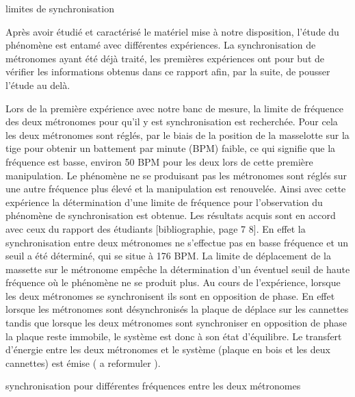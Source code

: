 

limites de synchronisation

	Après avoir étudié et caractérisé le matériel mise à notre disposition, l'étude du phénomène est entamé avec différentes expériences. La synchronisation de métronomes ayant été déjà traité, les premières expériences ont pour but de vérifier les informations obtenus dans ce rapport afin, par la suite, de pousser l'étude au delà.
	 
	Lors de la première expérience avec notre banc de mesure, la limite de fréquence des deux métronomes pour qu'il y est synchronisation est recherchée. Pour cela les deux métronomes sont réglés, par le biais de la position de la masselotte sur la tige pour obtenir un battement par minute (BPM) faible, ce qui signifie que la fréquence est basse, environ 50 BPM pour les deux lors de cette première manipulation. Le phénomène ne se produisant pas les métronomes sont réglés sur une autre fréquence plus élevé et la manipulation est renouvelée. Ainsi avec cette expérience la détermination d'une limite de fréquence pour l'observation du phénomène de synchronisation est obtenue. Les résultats acquis sont en accord avec ceux du rapport des étudiants [bibliographie, page 7 8]. En effet la synchronisation entre deux métronomes ne s'effectue pas en basse fréquence et un seuil a été déterminé, qui se situe à 176 BPM. La limite de déplacement de la massette sur le métronome empêche la détermination d'un éventuel seuil de haute fréquence où le phénomène ne se produit plus. Au cours de l'expérience, lorsque les deux métronomes se synchronisent ils sont en opposition de phase. En effet lorsque les métronomes sont désynchronisés la plaque  de déplace sur les cannettes tandis que lorsque les deux métronomes sont synchroniser en opposition de phase la plaque reste immobile, le système est donc à son état d'équilibre. Le transfert d'énergie entre les deux métronomes et le système (plaque en bois et les deux cannettes) est émise ( a reformuler ).
	 




synchronisation pour différentes fréquences entre les deux métronomes

